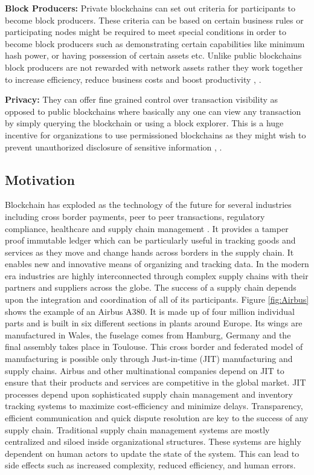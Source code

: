 \textbf{Block Producers:}
Private blockchains can set out criteria for participants to become block producers. These criteria can be based on certain business rules or participating nodes might be required to meet special conditions in order to become block producers such as demonstrating certain capabilities like minimum hash power, or having possession of certain assets etc. Unlike public blockchains block producers are not rewarded with network assets rather they work together to increase efficiency, reduce business costs and boost productivity \cite{arXiv:1806.03693}, \cite{misc:017}.
   
\textbf{Privacy:}
They can offer fine grained control over transaction visibility as opposed to public blockchains where basically any one can view any transaction by simply querying the blockchain or using a block explorer. This is a huge incentive for organizations to use permissioned blockchains as they might wish to prevent unauthorized disclosure of sensitive information \cite{arXiv:1806.03693}, \cite{misc:017}.
\clearpage
\subsection{Motivation}
Blockchain has exploded as the technology of the future for several industries including cross border payments, peer to peer transactions, regulatory compliance, healthcare and supply chain management \cite{misc:021}. It provides a tamper proof immutable ledger which can be particularly useful in tracking goods and services as they move and change hands across borders in the supply chain. It enables new and innovative means of organizing and tracking data. In the modern era industries are highly interconnected through complex supply chains with their partners and suppliers across the globe. The success of a supply chain depends upon the integration and coordination of all of its participants. Figure \ref{fig:Airbus} shows the example of an Airbus A380. It is made up of four million individual parts and is built in six different sections in plants around Europe. Its wings are manufactured in Wales, the fuselage comes from Hamburg, Germany and the final assembly takes place in Toulouse. This cross border and federated model of manufacturing is possible only through Just-in-time (JIT) manufacturing and supply chains. Airbus and other multinational companies depend on JIT to ensure that their products and services are competitive in the global market. JIT processes depend upon sophisticated supply chain management and inventory tracking systems to maximize cost-efficiency and minimize delays. Transparency, efficient communication and quick dispute resolution are key to the success of any supply chain. Traditional supply chain management systems are mostly centralized and siloed inside organizational structures. These systems are highly dependent on human actors to update the state of the system. This can lead to side effects such as increased complexity, reduced efficiency, and human errors.

